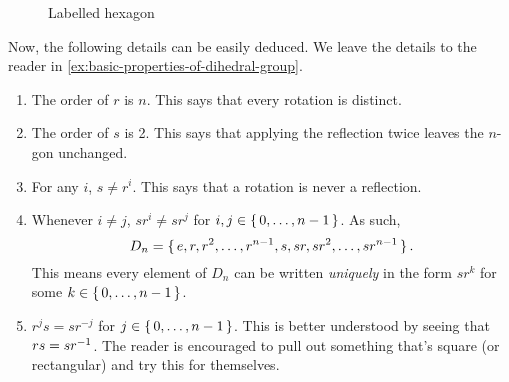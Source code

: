 \documentclass[./main.tex]{subfiles}
\begin{document}
\begin{figure}[h]
    \centering
    \caption{Labelled hexagon}
    \label{fig:labelled-hexagon-for-dihedral-group}
\end{figure}

Now, the following details can be easily deduced. We leave the details to the
reader in \cref{ex:basic-properties-of-dihedral-group}.
\begin{center}
    \begin{enumerate}
        \item The order of $r$ is $n$. This says that every rotation is distinct.
        \item The order of $s$ is 2. This says that applying the reflection
        twice leaves the $n$-gon unchanged.
        \item For any $i$, $s \neq r^i$. This says that a rotation is never a reflection.
        \item Whenever $i \neq j$, $sr^i \neq sr^j$ for $i, j \in \set{0, \dots, n-1}$. As such,
        \[
            D_n = \set{e, r, r^2, \dots, r^{n-1}, s, sr, sr^2, \dots, sr^{n-1}}.
        \]
        This means every element of $D_n$ can be written \emph{uniquely} in the
        form $sr^k$ for some $k \in \set{0, \dots, n-1}$.
        \item $r^j s = sr^{-j}$ for $j \in \set{0, \dots, n-1}$. This is better
        understood by seeing that $rs = sr^{-1}$. The reader is encouraged to
        pull out something that's square (or rectangular) and try this for
        themselves.
    \end{enumerate}
\end{center}
\end{document}
